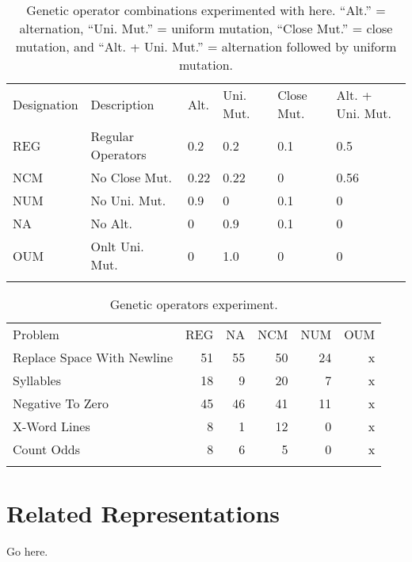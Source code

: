 \begin{table}
\centering
\caption{Genetic operator combinations experimented with here. ``Alt.'' = alternation, ``Uni. Mut.'' = uniform mutation, ``Close Mut.'' = close mutation, and ``Alt. + Uni. Mut.'' = alternation followed by uniform mutation.}
\label{genetic-opeartor-combinations}
\begin{tabular}{ll llll}
\hline\noalign{\smallskip}
Designation & Description & Alt. & Uni. Mut. & Close Mut. & Alt. + Uni. Mut. \\
\noalign{\smallskip}\svhline\noalign{\smallskip}
REG & Regular Operators &  0.2 &  0.2 &  0.1 &  0.5  \\
NCM & No Close Mut.  &  0.22 &  0.22 &  0 &  0.56  \\
NUM & No Uni. Mut. &  0.9 &  0 &  0.1 &  0  \\
NA  & No Alt. &  0 &  0.9 &  0.1 &  0  \\
OUM & Onlt Uni. Mut. &  0 &  1.0 &  0 &  0  \\
\noalign{\smallskip}\hline\noalign{\smallskip}
\end{tabular}
\end{table}


\begin{table}
\centering
\caption{Genetic operators experiment.}
\label{genetic-opeartor-results}
\begin{tabular}{l r r r r r}
\hline\noalign{\smallskip}
Problem                    & REG & NA & NCM & NUM & OUM \\
\noalign{\smallskip}\svhline\noalign{\smallskip}
Replace Space With Newline &  51 & 55 &  50 &  24 &   x \\
Syllables                  &  18 &  9 &  20 &   7 &   x \\
Negative To Zero           &  45 & 46 &  41 &  11 &   x \\
X-Word Lines               &   8 &  1 &  12 &   0 &   x \\
Count Odds                 &   8 &  6 &   5 &   0 &   x \\
\noalign{\smallskip}\hline\noalign{\smallskip}
\end{tabular}
\end{table}



\section{Related Representations}







\begin{acknowledgement}
Go here.
\end{acknowledgement}
%




